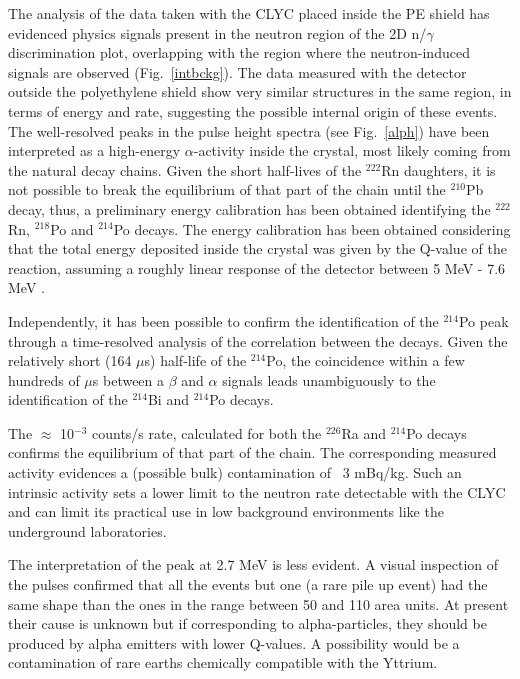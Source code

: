 \documentclass[review,number,sort&compress]{elsarticle}
\begin{document}
The analysis of the data taken with the CLYC placed inside the PE shield has evidenced physics signals present in the neutron region of the 2D n/$\gamma$ discrimination plot, overlapping with the region where the neutron-induced signals are observed (Fig.~\ref{intbckg}). The data measured with the detector outside the polyethylene shield show very similar structures in the same region, in terms of energy and rate, suggesting the possible internal origin of these events. The well-resolved peaks in the pulse height spectra (see Fig.~\ref{alph}) have been interpreted as a high-energy $\alpha$-activity inside the crystal, most likely coming from the natural decay chains. Given the short half-lives of the $^{222}$Rn daughters, it is not possible to break the equilibrium of that part of the chain until the  $^{210}$Pb decay, thus, a preliminary energy calibration has been obtained identifying the $^{222}$Rn, $^{218}$Po and $^{214}$Po decays. The energy calibration has been obtained considering that the total energy deposited inside the crystal was given by the Q-value of the reaction, assuming a roughly linear response of the detector between 5 MeV - 7.6 MeV .  

Independently, it has been possible to confirm the identification of the $^{214}$Po peak through a time-resolved analysis of the correlation between the decays. Given the relatively short (164 $\mu$s) half-life  of the $^{214}$Po, the coincidence within a few hundreds of $\mu$s between a $\beta$ and $\alpha$ signals leads unambiguously to the identification of the $^{214}$Bi and $^{214}$Po decays.

The $\approx$ 10$^{-3}$ counts/s rate, calculated for both the $^{226}$Ra and $^{214}$Po decays confirms the equilibrium of that part of  the chain. The corresponding measured activity evidences a (possible bulk) contamination of ~3 mBq/kg. Such an intrinsic activity sets a lower limit to the neutron rate detectable with the CLYC and can limit its practical use in low background environments like the underground laboratories.

The interpretation of the peak at 2.7 MeV is less evident. A visual inspection of the pulses confirmed that all the events but one (a rare pile up event) had the same shape than the ones in the range between 50 and 110 area units. At present their cause is unknown but if corresponding to alpha-particles, they should be produced by alpha emitters with lower Q-values. A possibility would be a contamination of rare earths chemically compatible with the Yttrium.
\end{document}

